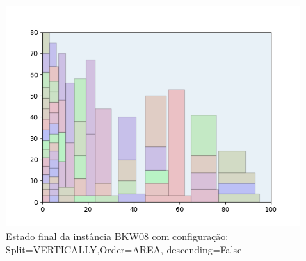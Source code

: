 \begin{figure}[H]
    \centering
    \caption[]{Estado final da instância BKW08 com configuração: Split=VERTICALLY,Order=AREA, descending=False}
    \label{fig:bkw08-vertically-area-false}
    \includegraphics[scale=0.5]{output/figures/bkw/bkw08/vertically/area/false/00}
\end{figure}